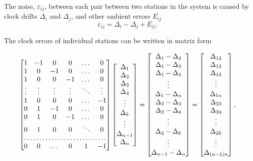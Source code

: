 \documentclass[12pt, sumlimits, intlimits]{article}
\begin{document}
The noise, $\varepsilon_{ij}$, between each pair between two stations in the system is caused by clock drifts $\Delta_i$ and $\Delta_j$, and other ambient errors $E_{ij}$
\begin{equation}
\varepsilon_{ij} =  \Delta_i - \Delta_j  + E_{ij}.
\end{equation}

The clock errors of individual stations can be written in matrix form 

\begin{equation*}
\begin{bmatrix}
1 & -1 & 0 & 0 & \dots  & 0 \\
1 & 0 & -1 & 0 & \dots  & 0 \\
1 &  0  & 0 & -1 & \dots   & 0 \\
\vdots & \vdots & \vdots  & \vdots & \ddots & \vdots \\
1 &  0  & 0 & 0 & \dots & -1 \\
0 &  1  & -1 & 0 & \dots & 0 \\
0 & 1 & 0 & -1 & \dots & 0 \\
0 & 1 & 0 & 0 & \ddots & 0 \\
\hdotsfor{6} \\
0 & 0 & \dots & 0& 1 & -1
\end{bmatrix}
\begin{bmatrix}
\Delta_1 \\ \Delta_2 \\ \Delta_3 \\ \Delta_4 \\ \vdots \\ \Delta_k \\ \vdots \\ \Delta_{n-1} \\ \Delta_n
\end{bmatrix}
= 
\begin{bmatrix}
\Delta_1 - \Delta_2 \\ \Delta_1-\Delta_3 \\ \Delta_1-\Delta_4 \\ \vdots \\ \Delta_1 - \Delta_{n} \\ \Delta_2- \Delta_3 \\ \Delta_2 - \Delta_4 \\ \vdots  \\ \Delta_2-\Delta_k \\ \vdots \\ \Delta_{n-1} - \Delta_n
\end{bmatrix}
= 
\begin{bmatrix}
\Delta_{12} \\ \Delta_{13} \\ \Delta_{14} \\ \vdots \\ \Delta_{1n} \\ \Delta_{23} \\ \Delta_{24} \\ \vdots \\ \Delta_{2k} \\ \vdots \\ \Delta_{(n-1)n}
\end{bmatrix} , 
\end{equation*}
\end{document}
